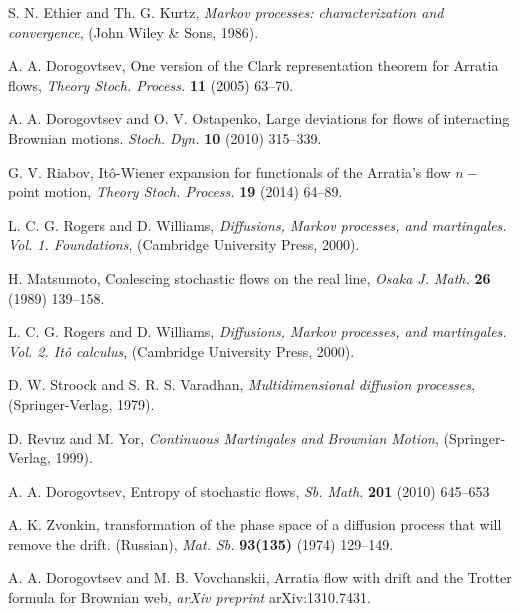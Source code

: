 \documentclass[a4paper,12pt]{article}
\newcommand{\1}{1\!\!\,{\rm I}}
\theoremstyle{plain}
\begin{document}
\begin{thebibliography}{99}
	 S. N. Ethier and Th. G. Kurtz, {\it Markov processes: characterization and convergence}, (John Wiley \& Sons, 1986).
	
	
	
	
	 A. A. Dorogovtsev, One version of the Clark representation theorem for Arratia flows, {\it Theory Stoch. Process.} {\bf 11} (2005) 63--70. 
	
	 A. A. Dorogovtsev and O. V. Ostapenko, Large deviations for flows of interacting Brownian motions. {\it Stoch. Dyn.} {\bf 10} (2010) 315--339. 
	
	 G. V. Riabov, It\^o-Wiener expansion for functionals of the Arratia's flow $n-$point motion, {\it Theory Stoch. Process.} {\bf 19} (2014) 64--89.
	
	 L. C. G. Rogers and D. Williams, {\it Diffusions, Markov processes, and martingales. Vol. 1. Foundations}, (Cambridge University Press, 2000).
	
	 H. Matsumoto, Coalescing stochastic flows on the real line, {\it Osaka J. Math.} {\bf 26} (1989) 139--158. 
	
	
	 L. C. G. Rogers and D. Williams, {\it Diffusions, Markov processes, and martingales. Vol. 2. It\^o calculus}, (Cambridge University Press, 2000).
	
	 D. W. Stroock and S. R. S. Varadhan, {\it Multidimensional diffusion processes}, (Springer-Verlag, 1979).
	
	 D. Revuz and M. Yor, {\it Continuous Martingales and Brownian Motion}, (Springer-Verlag, 1999).
	
	 A. A. Dorogovtsev, Entropy of stochastic flows, {\it Sb. Math.} {\bf 201} (2010) 645--653 
	
	 A. K. Zvonkin, transformation of the phase space of a diffusion process that will remove the drift. (Russian), {\it Mat. Sb.} {\bf 93(135)} (1974) 129--149. 
	
	
	 A. A. Dorogovtsev and M. B. Vovchanskii, Arratia flow with drift and the Trotter formula for Brownian web, {\it arXiv preprint} arXiv:1310.7431.


\end{thebibliography}
\end{document}
